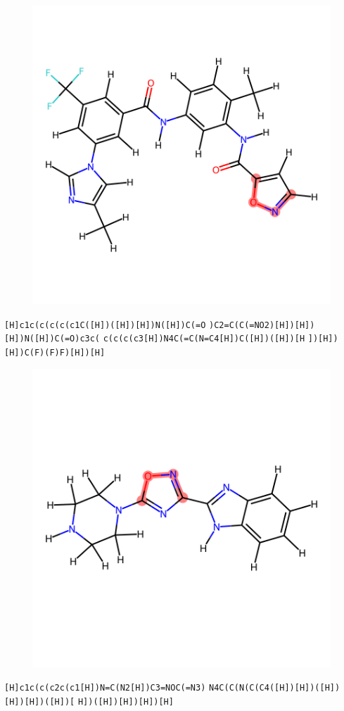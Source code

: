 \documentclass{article}
\begin{document}
\begin{figure}[ht]
\centering
    \includegraphics{mol58.png}
\end{figure}
\verb|[H]c1c(c(c(c(c1C([H])([H])[H])N([H])C(=O| \verb|)C2=C(C(=NO2)[H])[H])[H])N([H])C(=O)c3c(| \verb|c(c(c(c3[H])N4C(=C(N=C4[H])C([H])([H])[H| \verb|])[H])[H])C(F)(F)F)[H])[H]|

\begin{figure}[ht]
\centering
    \includegraphics{mol59.png}
\end{figure}
\verb|[H]c1c(c(c2c(c1[H])N=C(N2[H])C3=NOC(=N3)| \verb|N4C(C(N(C(C4([H])[H])([H])[H])[H])([H])[| \verb|H])([H])[H])[H])[H]|
\end{document}
